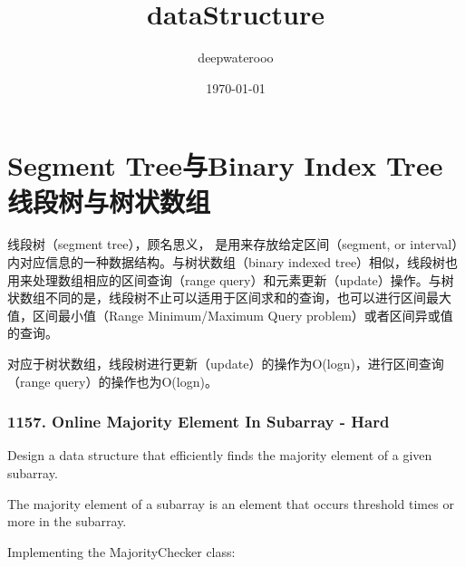 \documentclass[9pt, b5paaper]{book}
\author{deepwaterooo}
\date{\today}
\title{dataStructure}
\begin{document}
\maketitle
\tableofcontents


\chapter{Segment Tree与Binary Index Tree 线段树与树状数组}
\label{sec-1}

线段树（segment tree），顾名思义， 是用来存放给定区间（segment, or interval）内对应信息的一种数据结构。与树状数组（binary indexed tree）相似，线段树也用来处理数组相应的区间查询（range query）和元素更新（update）操作。与树状数组不同的是，线段树不止可以适用于区间求和的查询，也可以进行区间最大值，区间最小值（Range Minimum/Maximum Query problem）或者区间异或值的查询。

对应于树状数组，线段树进行更新（update）的操作为O(logn)，进行区间查询（range query）的操作也为O(logn)。

\subsection{1157. Online Majority Element In Subarray - Hard}
\label{sec-1-0-1}
Design a data structure that efficiently finds the majority element of a given subarray.

The majority element of a subarray is an element that occurs threshold times or more in the subarray.

Implementing the MajorityChecker class:
\end{document}
